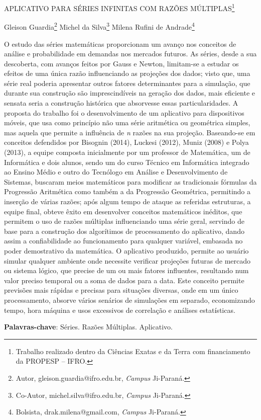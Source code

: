 \documentclass[article,12pt,onesidea,4paper,english,brazil]{abntex2}
\begin{document}
	
	
	\frenchspacing 
	
	\begin{center}
		\LARGE APLICATIVO PARA SÉRIES INFINITAS COM RAZÕES MÚLTIPLAS\footnote{Trabalho realizado dentro da Ciências Exatas e da Terra com financiamento da PROPESP – IFRO.}
		
		\normalsize
		Gleison Guardia\footnote{Autor, gleison.guardia@ifro.edu.br, \textit{Campus} Ji-Paraná.} 
		Michel da Silva\footnote{Co-Autor, michel.silva@ifro.edu.br, \textit{Campus} Ji-Paraná.} 
		Milena Rufini de Andrade\footnote{Bolsista, drak.milena@gmail.com, \textit{Campus} Ji-Paraná.} 
	\end{center}
	
	\noindent O estudo das séries matemáticas proporcionam um avanço nos conceitos de análise
	e probabilidade em demandas nos mercados futuros. As séries, desde a sua
	descoberta, com avanços feitos por Gauss e Newton, limitam-se a estudar os efeitos
	de uma única razão influenciando as projeções dos dados; visto que, uma série real
	poderia apresentar outros fatores determinantes para a simulação, que durante sua
	construção são imprescindíveis na geração dos dados, mais eficiente e sensata
	seria a construção histórica que absorvesse essas particularidades. A proposta do
	trabalho foi o desenvolvimento de um aplicativo para dispositivos móveis, que usa
	como princípio não uma série aritmética ou geométrica simples, mas aquela que
	permite a influência de \textit{n} razões na sua projeção. Baseando-se em conceitos
	defendidos por Bisognin (2014), Luckesi (2012), Muniz (2008) e Polya (2013), a
	equipe composta inicialmente por um professor de Matemática, um de Informática e
	dois alunos, sendo um do curso Técnico em Informática integrado ao Ensino Médio e
	outro do Tecnólogo em Análise e Desenvolvimento de Sistemas, buscaram meios
	matemáticos para modificar as tradicionais fórmulas da Progressão Aritmética como
	também a da Progressão Geométrica, permitindo a inserção de várias razões; após
	algum tempo de ataque as referidas estruturas, a equipe final, obteve êxito em
	desenvolver conceitos matemáticos inéditos, que permitem o uso de razões
	múltiplas influenciando uma série geral, servindo de base para a construção dos
	algorítimos de processamento do aplicativo, dando assim a confiabilidade ao
	funcionamento para qualquer variável, embasada no poder demostrativo da
	matemática. O aplicativo produzido, permite ao usuário simular qualquer ambiente
	onde necessite verificar projeções futuras de mercado ou sistema lógico, que precise
	de um ou mais fatores influentes, resultando num valor preciso temporal ou a soma
	de dados para a data. Este conceito permite previsões mais rápidas e precisas para
	situações diversas, onde em um único processamento, absorve vários senários de
	simulações em separado, economizando tempo, hora máquina e usos excessivos de
	correlação e análises estatísticas.
	
	\vspace{\onelineskip}
	
	\noindent
	\textbf{Palavras-chave}: Séries. Razões Múltiplas. Aplicativo.
	
\end{document}
